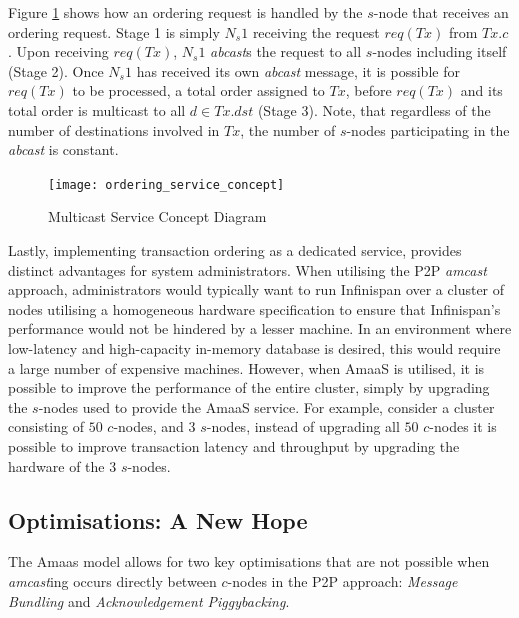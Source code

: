 Figure \ref{fig:ordering_service_concept} shows how an ordering request is handled by the $s$-node that receives an ordering request.  Stage 1 is simply $N_s1$ receiving the request $req(Tx)$ from $Tx.c$.  Upon receiving $req(Tx)$, $N_s1$ \emph{abcast}s the request to all $s$-nodes including itself (Stage 2).  Once $N_s1$ has received its own \emph{abcast} message, it is possible for $req(Tx)$ to be processed, a total order assigned to $Tx$, before $req(Tx)$ and its total order is multicast to all $d \in Tx.dst$ (Stage 3).  Note, that regardless of the number of destinations involved in $Tx$, the number of $s$-nodes participating in the \emph{abcast} is constant.  

    \begin{figure}[htbp!] 
        \centering    
         \texttt{[image: ordering\_service\_concept]}
         \caption[Multicast Service Concept Diagram]{Multicast Service Concept Diagram}
         \label{fig:ordering_service_concept}
    \end{figure}	 

	Lastly, implementing transaction ordering as a dedicated service, provides distinct advantages for system administrators.  When utilising the P2P \emph{amcast} approach, administrators would typically want to run Infinispan over a cluster of nodes utilising a homogeneous hardware specification to ensure that Infinispan's performance would not be hindered by a lesser machine.  In an environment where low-latency and high-capacity in-memory database is desired, this would require a large number of expensive machines. However, when \textsf{AmaaS} is utilised, it is possible to improve the performance of the entire cluster, simply by upgrading the $s$-nodes used to provide the \textsf{AmaaS} service.  For example, consider a cluster consisting of $50$ $c$-nodes, and $3$ $s$-nodes, instead of upgrading all $50$ $c$-nodes it is possible to improve transaction latency and throughput by upgrading the hardware of the $3$ $s$-nodes.  
	
	\subsection{Optimisations: A New Hope}\label{ssec:abaas_optimisations}
	The \textsf{Amaas} model allows for two key optimisations that are not possible when \emph{amcast}ing occurs directly between $c$-nodes in the P2P approach: \emph{Message Bundling} and \emph{Acknowledgement Piggybacking}.  
	
